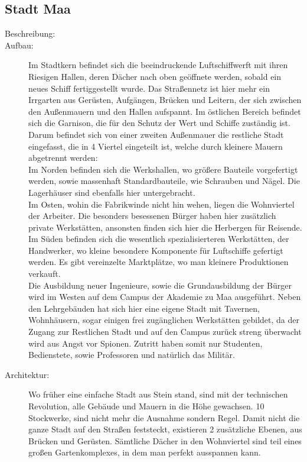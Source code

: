 \documentclass[a4paper,12pt,oneside]{book}
\begin{document}
\subsection{Stadt Maa}
\begin{description}
\item[Beschreibung:]
\item[Aufbau:]Im Stadtkern befindet sich die beeindruckende Luftschiffwerft mit ihren Riesigen Hallen, deren Dächer nach oben geöffnete werden, sobald ein neues Schiff fertiggestellt wurde. Das Straßennetz ist hier mehr ein Irrgarten aus Gerüsten, Aufgängen, Brücken und Leitern, der sich zwischen den Außenmauern und den Hallen aufspannt. Im östlichen Bereich befindet sich die Garnison, die für den Schutz der Wert und Schiffe zuständig ist.
\\Darum befindet sich von einer zweiten Außenmauer die restliche Stadt eingefasst, die in 4 Viertel eingeteilt ist, welche durch kleinere Mauern abgetrennt werden:
\\Im Norden befinden sich die Werkshallen, wo größere Bauteile vorgefertigt werden, sowie massenhaft Standardbauteile, wie Schrauben und Nägel. Die Lagerhäuser sind ebenfalls hier untergebracht.
\\Im Osten, wohin die Fabrikwinde nicht hin wehen, liegen die Wohnviertel der Arbeiter. Die besonders besessenen Bürger haben hier zusätzlich private Werkstätten, ansonsten finden sich hier die Herbergen für Reisende.
\\Im Süden befinden sich die wesentlich spezialisierteren Werkstätten, der Handwerker, wo kleine besondere Komponente für Luftschiffe gefertigt werden. Es gibt vereinzelte Marktplätze, wo man kleinere Produktionen verkauft.
\\Die Ausbildung neuer Ingenieure, sowie die Grundausbildung der Bürger wird im Westen auf dem Campus der Akademie zu Maa ausgeführt. Neben den Lehrgebäuden hat sich hier eine eigene Stadt mit Tavernen, Wohnhäusern, sogar einigen frei zugänglichen Werkstätten gebildet, da der Zugang zur Restlichen Stadt und auf den Campus zurück streng überwacht wird aus Angst vor Spionen. Zutritt haben somit nur Studenten, Bedienstete, sowie Professoren und natürlich das Militär.
\item[Architektur:]Wo früher eine einfache Stadt aus Stein stand, sind mit der technischen Revolution, alle Gebäude und Mauern in die Höhe gewachsen. 10 Stockwerke, sind nicht mehr die Ausnahme sondern Regel. Damit nicht die ganze Stadt auf den Straßen feststeckt, existieren 2 zusätzliche Ebenen, aus Brücken und Gerüsten. Sämtliche Dächer in den Wohnviertel sind teil eines großen Gartenkomplexes, in dem man perfekt ausspannen kann.
\end{description}
\end{document}
